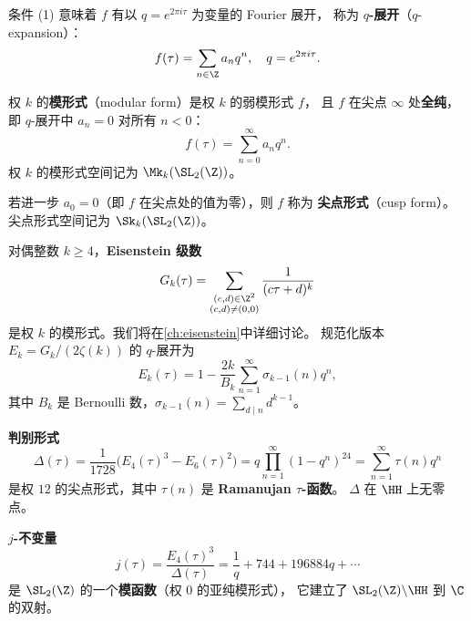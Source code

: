 条件 (1) 意味着 $f$ 有以 $q = e^{2\pi i\tau}$ 为变量的 Fourier 展开，
称为 \textbf{$q$-展开}（$q$-expansion）：
\[
  f(\tau) = \sum_{n \in \Z} a_n q^n, \quad q = e^{2\pi i\tau}.
\]

\begin{definition}[模形式与尖点形式]
\label{def:modular-form}
权 $k$ 的\textbf{模形式}（modular form）是权 $k$ 的弱模形式 $f$，
且 $f$ 在尖点 $\infty$ 处\textbf{全纯}，即 $q$-展开中 $a_n = 0$ 对所有 $n < 0$：
\[
  f(\tau) = \sum_{n=0}^{\infty} a_n q^n.
\]
权 $k$ 的模形式空间记为 $\Mk_k(\SL_2(\Z))$。

若进一步 $a_0 = 0$（即 $f$ 在尖点处的值为零），则 $f$ 称为
\textbf{尖点形式}（cusp form）。尖点形式空间记为 $\Sk_k(\SL_2(\Z))$。
\end{definition}

\begin{example}[Eisenstein 级数]
\label{ex:eisenstein-preview}
对偶整数 $k \geq 4$，\textbf{Eisenstein 级数}
\[
  G_k(\tau) = \sum_{\substack{(c,d) \in \Z^2 \\ (c,d) \neq (0,0)}}
  \frac{1}{(c\tau + d)^k}
\]
是权 $k$ 的模形式。我们将在\cref{ch:eisenstein}中详细讨论。
规范化版本 $E_k = G_k / (2\zeta(k))$ 的 $q$-展开为
\[
  E_k(\tau) = 1 - \frac{2k}{B_k} \sum_{n=1}^{\infty} \sigma_{k-1}(n) q^n,
\]
其中 $B_k$ 是 Bernoulli 数，$\sigma_{k-1}(n) = \sum_{d \mid n} d^{k-1}$。
\end{example}

\begin{example}
\label{ex:discriminant-form}
\textbf{判别形式}
\[
  \Delta(\tau) = \frac{1}{1728}\bigl(E_4(\tau)^3 - E_6(\tau)^2\bigr)
  = q \prod_{n=1}^{\infty}(1 - q^n)^{24}
  = \sum_{n=1}^{\infty} \tau(n) q^n
\]
是权 $12$ 的尖点形式，其中 $\tau(n)$ 是 \textbf{Ramanujan $\tau$-函数}。
$\Delta$ 在 $\HH$ 上无零点。
\end{example}

\begin{example}[$j$-不变量]
\label{ex:j-invariant-function}
\textbf{$j$-不变量}
\[
  j(\tau) = \frac{E_4(\tau)^3}{\Delta(\tau)} = \frac{1}{q} + 744 + 196884q + \cdots
\]
是 $\SL_2(\Z)$ 的一个\textbf{模函数}（权 $0$ 的亚纯模形式），
它建立了 $\SL_2(\Z) \backslash \HH$ 到 $\C$ 的双射。
\end{example}


